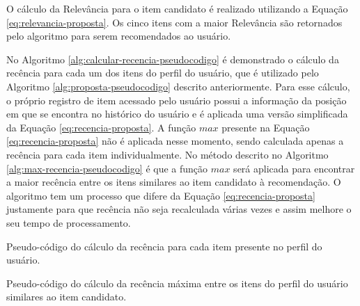 O cálculo da Relevância para o item candidato é realizado utilizando a Equação \ref{eq:relevancia-proposta}. Os cinco
itens com a maior Relevância são retornados pelo algoritmo para serem recomendados ao usuário.

No Algoritmo \ref{alg:calcular-recencia-pseudocodigo} é demonstrado o cálculo da recência para cada um dos itens do perfil do
usuário, que é utilizado pelo Algoritmo \ref{alg:proposta-pseudocodigo} descrito anteriormente. Para esse cálculo, o próprio registro
de item acessado pelo usuário possui a informação da posição em que se encontra no histórico do usuário e é aplicada
uma versão simplificada da Equação \ref{eq:recencia-proposta}. A função $max$ presente na Equação \ref{eq:recencia-proposta}
não é aplicada nesse momento, sendo calculada apenas a recência
para cada item individualmente. No método descrito no Algoritmo \ref{alg:max-recencia-pseudocodigo} é que a função $max$ será
aplicada para encontrar a maior recência entre os itens similares ao item candidato à recomendação. O algoritmo tem um processo
que difere da Equação \ref{eq:recencia-proposta} justamente para que recência não seja recalculada várias vezes e assim
melhore o seu tempo de processamento.

\begin{algorithm}
  \caption{Pseudo-código do cálculo da recência para cada item presente no perfil do usuário. \label{alg:calcular-recencia-pseudocodigo}}


\end{algorithm}

\begin{algorithm}
  \caption{Pseudo-código do cálculo da recência máxima entre os itens do perfil do usuário similares ao item candidato. \label{alg:max-recencia-pseudocodigo}}


\end{algorithm}


